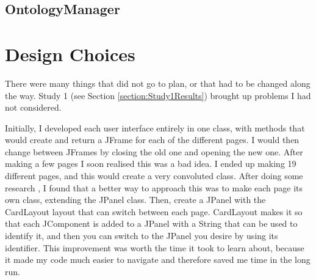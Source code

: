 \subsection{OntologyManager}


\section{Design Choices}
There were many things that did not go to plan, or that had to be changed along the way. Study 1 (see Section \ref{section:Study1Results}) brought up problems I had not considered.

Initially, I developed each user interface entirely in one class, with methods that would create and return a JFrame for each of the different pages. I would then change between JFrames by closing the old one and opening the new one. After making a few pages I soon realised this was a bad idea. I ended up making 19 different pages, and this would create a very convoluted class. After doing some research \cite{card_layout_2011}, I found that a better way to approach this was to make each page its own class, extending the JPanel class. Then, create a JPanel with the CardLayout layout that can switch between each page. CardLayout makes it so that each JComponent is added to a JPanel with a String that can be used to identify it, and then you can switch to the JPanel you desire by using its identifier. This improvement was worth the time it took to learn about, because it made my code much easier to navigate and therefore saved me time in the long run.


